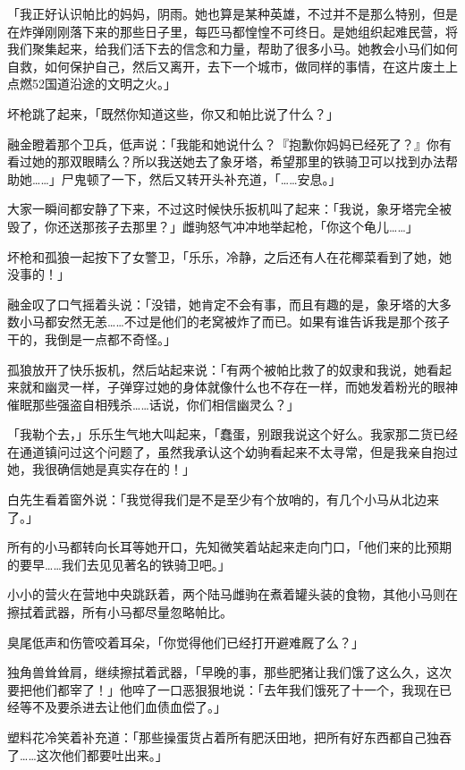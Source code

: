 「我正好认识帕比的妈妈，阴雨。她也算是某种英雄，不过并不是那么特别，但是在炸弹刚刚落下来的那些日子里，每匹马都惶惶不可终日。是她组织起难民营，将我们聚集起来，给我们活下去的信念和力量，帮助了很多小马。她教会小马们如何自救，如何保护自己，然后又离开，去下一个城市，做同样的事情，在这片废土上点燃52国道沿途的文明之火。」

坏枪跳了起来，「既然你知道这些，你又和帕比说了什么？」

融金瞪着那个卫兵，低声说：「我能和她说什么？『抱歉你妈妈已经死了？』你有看过她的那双眼睛么？所以我送她去了象牙塔，希望那里的铁骑卫可以找到办法帮助她……」尸鬼顿了一下，然后又转开头补充道，「……安息。」

大家一瞬间都安静了下来，不过这时候快乐扳机叫了起来：「我说，象牙塔完全被毁了，你还送那孩子去那里？」雌驹怒气冲冲地举起枪，「你这个龟儿……」

坏枪和孤狼一起按下了女警卫，「乐乐，冷静，之后还有人在花椰菜看到了她，她没事的！」

融金叹了口气摇着头说：「没错，她肯定不会有事，而且有趣的是，象牙塔的大多数小马都安然无恙……不过是他们的老窝被炸了而已。如果有谁告诉我是那个孩子干的，我倒是一点都不奇怪。」

孤狼放开了快乐扳机，然后站起来说：「有两个被帕比救了的奴隶和我说，她看起来就和幽灵一样，子弹穿过她的身体就像什么也不存在一样，而她发着粉光的眼神催眠那些强盗自相残杀……话说，你们相信幽灵么？」

「我勒个去，」乐乐生气地大叫起来，「蠢蛋，别跟我说这个好么。我家那二货已经在通道镇问过这个问题了，虽然我承认这个幼驹看起来不太寻常，但是我亲自抱过她，我很确信她是真实存在的！」

白先生看着窗外说：「我觉得我们是不是至少有个放哨的，有几个小马从北边来了。」

所有的小马都转向长耳等她开口，先知微笑着站起来走向门口，「他们来的比预期的要早……我们去见见著名的铁骑卫吧。」

\horizonline


小小的营火在营地中央跳跃着，两个陆马雌驹在煮着罐头装的食物，其他小马则在擦拭着武器，所有小马都尽量忽略帕比。

臭尾低声和伤管咬着耳朵，「你觉得他们已经打开避难厩了么？」

独角兽耸耸肩，继续擦拭着武器，「早晚的事，那些肥猪让我们饿了这么久，这次要把他们都宰了！」他啐了一口恶狠狠地说：「去年我们饿死了十一个，我现在已经等不及要杀进去让他们血债血偿了。」

塑料花冷笑着补充道：「那些操蛋货占着所有肥沃田地，把所有好东西都自己独吞了……这次他们都要吐出来。」

